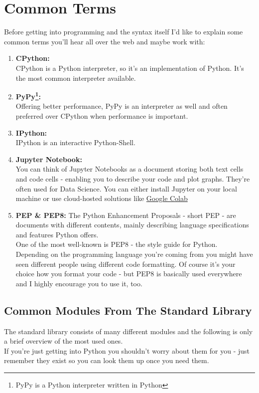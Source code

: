 \section{Common Terms}
    Before getting into programming and the syntax itself I'd like to explain some common terms you'll hear all over the web and maybe work with:
    \begin{enumerate}
        \item \textbf{CPython:}\\
            CPython is a Python interpreter, so it's an implementation of Python.
            It's the most common interpreter available.
        \item \textbf{PyPy\footnote{PyPy is a Python interpreter written in Python}:}\\
            Offering better performance, PyPy is an interpreter as well and often preferred over CPython when performance is important.
        \item \textbf{IPython:}\\
            IPython is an interactive Python-Shell.
        \item \textbf{Jupyter Notebook:}\\
            You can think of Jupyter Notebooks as a document storing both text cells and code cells - enabling you to describe your code and plot graphs. They're often used for Data Science.
            You can either install Jupyter on your local machine or use cloud-hosted solutions like \href{https://colab.research.google.com/}{Google Colab}
        \item \textbf{PEP \& PEP8:}
            The Python Enhancement Proposals - short PEP - are documents with different contents, mainly describing language specifications and features Python offers.\\
            One of the most well-known is PEP8 - the style guide for Python.\\
            Depending on the programming language you're coming from you might have seen different people using different code formatting.
            Of course it's your choice how you format your code - but PEP8 is basically used everywhere and I highly encourage you to use it, too.
        \end{enumerate}
        
    \subsection{Common Modules From The Standard Library}
        The standard library consists of many different modules and the following is only a brief overview of the most used ones.\\
        If you're just getting into Python you shouldn't worry about them for you - just remember they exist so you can look them up once you need them.
        

